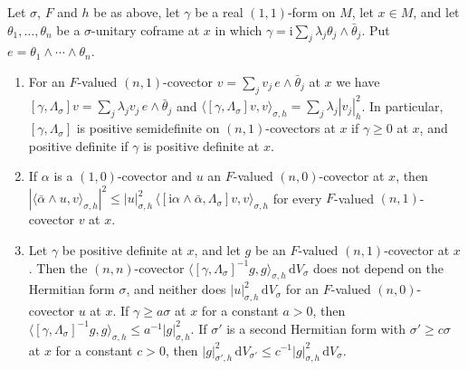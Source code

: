 \begin{lemma}\label{lem:n-one-curvature-operator}
Let $\sigma$, $F$ and $h$ be as above, let $\gamma$ be a real $(1,1)$-form on $M$, let $x\in M$, and let $\theta_1,\ldots,\theta_n$ be a $\sigma$-unitary coframe at $x$ in which $\gamma=\mathrm i\sum_j\lambda_j\theta_j\wedge\bar\theta_j$. Put $e=\theta_1\wedge\cdots\wedge\theta_n$.
\begin{enumerate}
\item For an $F$-valued $(n,1)$-covector $v=\sum_jv_j\,e\wedge\bar\theta_j$ at $x$ we have $[\gamma,\Lambda_\sigma]v=\sum_j\lambda_jv_j\,e\wedge\bar\theta_j$ and $\langle[\gamma,\Lambda_\sigma]v,v\rangle_{\sigma,h}=\sum_j\lambda_j|v_j|_h^2$. In particular, $[\gamma,\Lambda_\sigma]$ is positive semidefinite on $(n,1)$-covectors at $x$ if $\gamma\geq0$ at $x$, and positive definite if $\gamma$ is positive definite at $x$.
\item If $\alpha$ is a $(1,0)$-covector and $u$ an $F$-valued $(n,0)$-covector at $x$, then $|\langle\bar\alpha\wedge u,v\rangle_{\sigma,h}|^2\leq|u|_{\sigma,h}^2\,\langle[\mathrm i\alpha\wedge\bar\alpha,\Lambda_\sigma]v,v\rangle_{\sigma,h}$ for every $F$-valued $(n,1)$-covector $v$ at $x$.
\item Let $\gamma$ be positive definite at $x$, and let $g$ be an $F$-valued $(n,1)$-covector at $x$. Then the $(n,n)$-covector $\langle[\gamma,\Lambda_\sigma]^{-1}g,g\rangle_{\sigma,h}\,\mathrm dV_\sigma$ does not depend on the Hermitian form $\sigma$, and neither does $|u|_{\sigma,h}^2\,\mathrm dV_\sigma$ for an $F$-valued $(n,0)$-covector $u$ at $x$. If $\gamma\geq a\sigma$ at $x$ for a constant $a>0$, then $\langle[\gamma,\Lambda_\sigma]^{-1}g,g\rangle_{\sigma,h}\leq a^{-1}|g|_{\sigma,h}^2$. If $\sigma'$ is a second Hermitian form with $\sigma'\geq c\sigma$ at $x$ for a constant $c>0$, then $|g|_{\sigma',h}^2\,\mathrm dV_{\sigma'}\leq c^{-1}|g|_{\sigma,h}^2\,\mathrm dV_\sigma$.
\end{enumerate}
\end{lemma}
